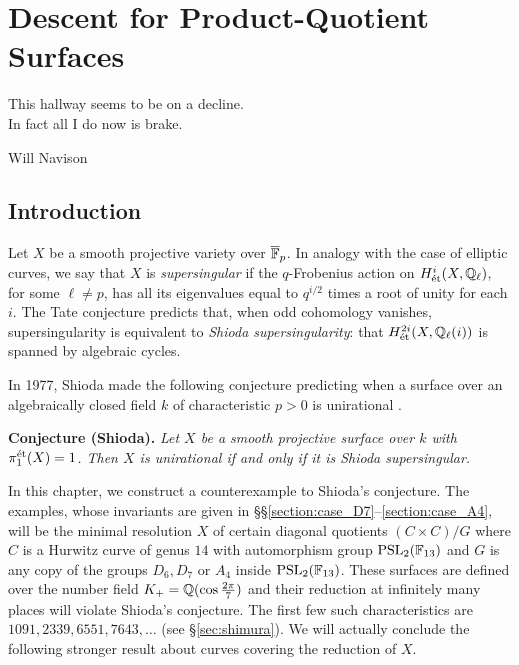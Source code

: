\documentclass[main.tex]{subfiles}
\begin{document}
\chapter{Descent for Product-Quotient Surfaces}\label{chapter:obstructions}
\epigraph{\quad \quad This hallway seems to be on a decline. \\ \quad \quad \quad \quad \quad \quad \quad \quad \quad In fact all I do now is brake.}{Will Navison}


\section{Introduction}

Let $X$ be a smooth projective variety over $\overline{\mathbb{F}}_p$. In analogy with the case of elliptic curves, we say that $X$ is \textit{supersingular} if the $q$-Frobenius action on $H^i_{\mathrm{\acute{e}t}}(X, \mathbb{Q}_{\ell})$, for some $\ell \neq p$, has all its eigenvalues equal to $q^{i/2}$ times a root of unity for each $i$. The Tate conjecture predicts that, when odd cohomology vanishes, supersingularity is equivalent to \textit{Shioda supersingularity}: that $H^{2i}_{\mathrm{\acute{e}t}}(X, \mathbb{Q}_{\ell}(i))$ is spanned by algebraic cycles.
\par
In 1977, Shioda made the following conjecture predicting when a surface over an algebraically closed field $k$ of characteristic $p > 0$ is unirational \cite{Shioda:unirational}.

\noindent
\textbf{Conjecture (Shioda).} \emph{Let $X$ be a smooth projective surface over $k$ with $\pi_1^{\mathrm{\acute{e}t}}(X) = 1$. Then $X$ is unirational if and only if it is Shioda supersingular.}

In this chapter, we construct a counterexample to Shioda's conjecture. The examples, whose invariants are given in \S\S\ref{section:case_D7}--\ref{section:case_A4}, will be the minimal resolution $X$ of certain diagonal quotients $(C \times C)/G$ where $C$ is a Hurwitz curve of genus $14$ with automorphism group $\mathrm{PSL}_2(\mathbb{F}_{13})$ and $G$ is any copy of the groups $D_{6}, D_{7}$ or $A_4$ inside $\mathrm{PSL}_2(\mathbb{F}_{13})$. These surfaces are defined over the number field $K_+ = \mathbb{Q}(\cos{\frac{2 \pi}{7}})$ and their reduction at infinitely many places will violate Shioda's conjecture. The first few such characteristics are $1091, 2339, 6551, 7643, \dots$ (see \S\ref{sec:shimura}).   We will actually conclude the following stronger result about curves covering the reduction of $X$.
\end{document}

